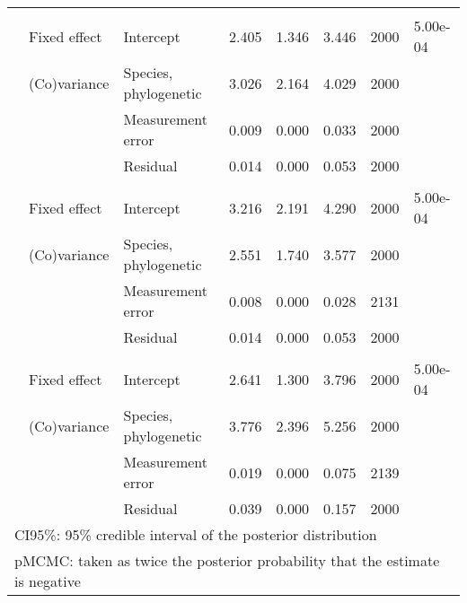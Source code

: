 \begin{table}
\begin{tabular}[t]{llllllll}
\addlinespace[0.3em]
\multicolumn{8}{l}{\textbf{Antibiotic degradation}}\\
\hspace{1em} & Fixed effect & Intercept & 2.405 & 1.346 & 3.446 & 2000 & 5.00e-04\\
\hspace{1em} & (Co)variance & Species, phylogenetic & 3.026 & 2.164 & 4.029 & 2000 & \\
\hspace{1em} &  & Measurement error & 0.009 & 0.000 & 0.033 & 2000 & \\
\hspace{1em} &  & Residual & 0.014 & 0.000 & 0.053 & 2000 \vphantom{1} & \\
\addlinespace[0.3em]
\multicolumn{8}{l}{\textbf{Quorum sensing}}\\
\hspace{1em} & Fixed effect & Intercept & 3.216 & 2.191 & 4.290 & 2000 & 5.00e-04\\
\hspace{1em} & (Co)variance & Species, phylogenetic & 2.551 & 1.740 & 3.577 & 2000 & \\
\hspace{1em} &  & Measurement error & 0.008 & 0.000 & 0.028 & 2131 & \\
\hspace{1em} &  & Residual & 0.014 & 0.000 & 0.053 & 2000 & \\
\addlinespace[0.3em]
\multicolumn{8}{l}{\textbf{Secretion systems}}\\
\hspace{1em} & Fixed effect & Intercept & 2.641 & 1.300 & 3.796 & 2000 & 5.00e-04\\
\hspace{1em} & (Co)variance & Species, phylogenetic & 3.776 & 2.396 & 5.256 & 2000 & \\
\hspace{1em} &  & Measurement error & 0.019 & 0.000 & 0.075 & 2139 & \\
\hspace{1em} &  & Residual & 0.039 & 0.000 & 0.157 & 2000 & \\
\bottomrule
\multicolumn{8}{l}{\rule{0pt}{1em}CI95\%: 95\% credible interval of the posterior distribution}\\
\multicolumn{8}{l}{\rule{0pt}{1em}pMCMC: taken as twice the posterior probability that the estimate is negative}\\
\end{tabular}
\end{table}
